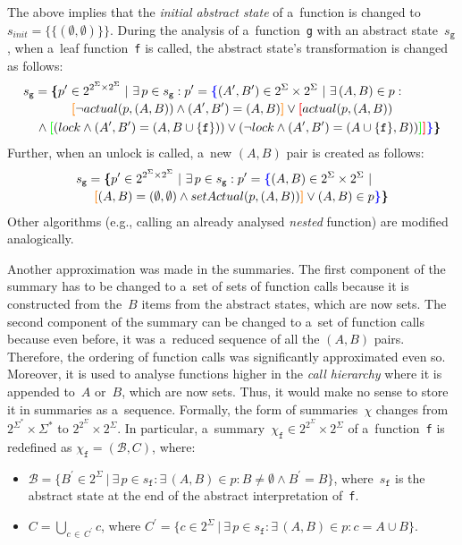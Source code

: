 The above implies that the \emph{initial abstract state} of a~function is changed to $ s_{init} = \{\{(\emptyset, \emptyset)\}\} $. During the analysis of a~function~\texttt{g} with an abstract state~$ s_\mathtt{g} $, when a~leaf function~\texttt{f} is called, the abstract state's transformation is changed as follows:
$$
\begin{multlined}
    s_\mathtt{g} = \bb{\{}p^\prime \in 2^{2^\Sigma \times 2^\Sigma}\ |\ \exists\,p \in s_\mathtt{g} : p^\prime = \bA{\{}(A^\prime, B^\prime) \in 2^\Sigma \times 2^\Sigma\ |\ \exists\,(A, B) \in p : \\
%
    \bB{[}\neg actual(p, (A, B)) \wedge (A^\prime, B^\prime) = (A, B)\bB{]} \vee \bC{[}actual(p, (A, B)) \\
%
    \wedge \bD{[}(lock \wedge (A^\prime, B^\prime) = (A, B \cup \{\mathtt{f}\})) \vee (\neg lock \wedge (A^\prime, B^\prime) = (A \cup \{\mathtt{f}\}, B))%
%
    \bD{]}\bC{]}\bA{\}}\bb{\}}
\end{multlined}
$$
Further, when an unlock is called, a~new $ (A, B) $ pair is created as follows:
$$
\begin{multlined}
    s_\mathtt{g} = \bb{\{}p^\prime \in 2^{2^\Sigma \times 2^\Sigma}\ |\ \exists\,p \in s_\mathtt{g} : p^\prime = \bA{\{}(A, B) \in 2^\Sigma \times 2^\Sigma\ |\ \\
%
    \bB{[}(A, B) = (\emptyset, \emptyset) \wedge setActual(p, (A, B))\bB{]} \vee (A, B) \in p%
%
    \bA{\}}\bb{\}}
\end{multlined}
$$
Other algorithms (e.g., calling an already analysed \emph{nested} function) are modified analogically.

Another approximation was made in the summaries. The first component of the summary has to be changed to a~set of sets of function calls because it is constructed from the~$ B $ items from the abstract states, which are now sets. The second component of the summary can be changed to a~set of function calls because even before, it was a~reduced sequence of all the $ (A, B) $ pairs. Therefore, the ordering of function calls was significantly approximated even so. Moreover, it is used to analyse functions higher in the \emph{call hierarchy} where it is appended to~$ A $ or~$ B $, which are now sets. Thus, it would make no sense to store it in summaries as a~sequence. Formally, the form of summaries~$ \chi $ changes from $ 2^{\Sigma^*} \times \Sigma^* $ to $ 2^{2^\Sigma} \times 2^\Sigma $. In particular, a~summary~$ \chi_\mathtt{f} \in 2^{2^\Sigma} \times 2^\Sigma $ of a~function~\texttt{f} is redefined as $ \chi_\mathtt{f} = (\mathcal{B}, C) $, where:
\begin{itemize}
    \item $ \mathcal{B} = \{B^\prime \in 2^\Sigma\ |\ \exists\,p \in s_\mathtt{f} : \exists\,(A, B) \in p : B \neq \emptyset \wedge B^\prime = B\} $, where~$ s_\mathtt{f} $ is the abstract state at the end of the abstract interpretation of~\texttt{f}.

    \item $ C = \bigcup\limits_{c\,\in\,C^\prime} c $, where $ C^\prime = \{c \in 2^\Sigma\ |\ \exists\,p \in s_\mathtt{f} : \exists\,(A, B) \in p: c = A \cup B\} $.
\end{itemize}

